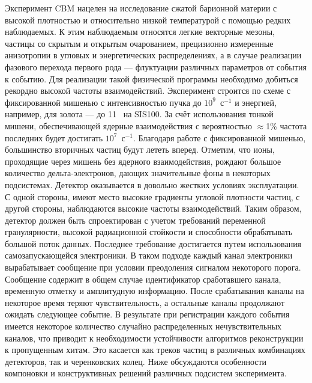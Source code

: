 \bigskip

Эксперимент CBM нацелен на исследование сжатой барионной материи с высокой плотностью и относительно низкой температурой с помощью редких наблюдаемых. К этим наблюдаемым относятся легкие векторные мезоны, частицы со скрытым и открытым очарованием, прецизионно измеренные анизотропии в угловых и энергетических распределениях, а в случае реализации фазового перехода первого рода --- флуктуации различных параметров от события к событию. Для реализации такой физической программы необходимо добиться рекордно высокой частоты взаимодействий. Эксперимент строится по схеме с фиксированной мишенью с интенсивностью пучка до $10^9$~с$^{-1}$ и энергией, например, для золота --- до 11~\GeVperNucl{} на SIS100. За счёт использования тонкой мишени, обеспечивающей ядерные взаимодействия с вероятностью $\approx$1\% частота последних будет достигать $10^7$~с$^{-1}$. Благодаря работе с фиксированной мишенью, большинство вторичных частиц будут лететь вперед. Отметим, что ионы, проходящие через мишень без ядерного взаимодействия, рождают большое количество дельта-электронов, дающих значительные фоны в некоторых подсистемах. Детектор оказывается в довольно жестких условиях эксплуатации. С одной стороны, имеют место высокие градиенты угловой плотности частиц, с другой стороны, наблюдаются высокие частоты взаимодействий. Таким образом, детектор должен быть спроектирован с учетом требований переменной гранулярности, высокой радиационной стойкости и способности обрабатывать большой поток данных. Последнее требование достигается путем использования самозапускающейся электроники. В таком подходе каждый канал электроники вырабатывает сообщение при условии преодоления сигналом некоторого порога. Сообщение содержит в общем случае идентификатор сработавшего канала, временную отметку и амплитудную информацию. После срабатывания каналы на некоторое время теряют чувствительность, а остальные каналы продолжают ожидать следующее событие. В результате при регистрации каждого события имеется некоторое количество случайно распределенных нечувствительных каналов, что приводит к необходимости устойчивости алгоритмов реконструкции к пропущенным хитам. Это касается как треков частиц в различных комбинациях детекторов, так и черенковских колец. Ниже обсуждаются особенности компоновки и конструктивных решений различных подсистем эксперимента.